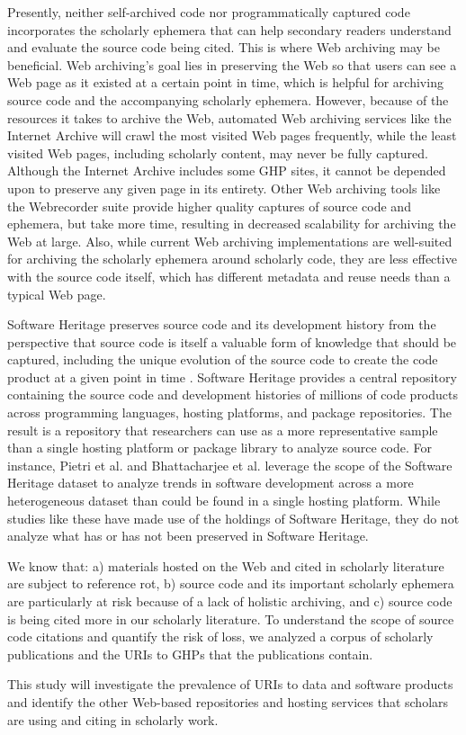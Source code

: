 Presently, neither self-archived code nor programmatically captured code incorporates the scholarly ephemera that can help secondary readers understand and evaluate the source code being cited. This is where Web archiving may be beneficial. Web archiving's goal lies in preserving the Web so that users can see a Web page as it existed at a certain point in time, which is helpful for archiving source code and the accompanying scholarly ephemera. However, because of the resources it takes to archive the Web, automated Web archiving services like the Internet Archive will crawl the most visited Web pages frequently, while the least visited Web pages, including scholarly content, may never be fully captured. Although the Internet Archive includes some GHP sites, it cannot be depended upon to preserve any given page in its entirety. Other Web archiving tools like the Webrecorder suite \cite{webrecorder} provide higher quality captures of source code and ephemera, but take more time, resulting in decreased scalability for archiving the Web at large. Also, while current Web archiving implementations are well-suited for archiving the scholarly ephemera around scholarly code, they are less effective with the source code itself, which has different metadata and reuse needs than a typical Web page. 

Software Heritage preserves source code and its development history from the perspective that source code is itself a valuable form of knowledge that should be captured, including the unique evolution of the source code to create the code product at a given point in time \cite{dicosmo-ipres2017}. Software Heritage provides a central repository containing the source code and development histories of millions of code products across programming languages, hosting platforms, and package repositories. The result is a repository that researchers can use as a more representative sample than a single hosting platform or package library to analyze source code. For instance, Pietri et al. \cite{pietri-msr2020} and Bhattacharjee et al. \cite{bhattacharjee-msr2020} leverage the scope of the Software Heritage dataset to analyze trends in software development across a more heterogeneous dataset than could be found in a single hosting platform. While studies like these have made use of the holdings of Software Heritage, they do not analyze what has or has not been preserved in Software Heritage.

We know that: a) materials hosted on the Web and cited in scholarly literature are subject to reference rot, b) source code and its important scholarly ephemera are particularly at risk because of a lack of holistic archiving,
and c) source code is being cited more in our scholarly literature. To understand the scope of source code citations and quantify the risk of loss, we analyzed a corpus of scholarly publications and the URIs to GHPs that the publications contain.

This study will investigate the prevalence of URIs to data and software products and identify the other Web-based repositories and hosting services that scholars are using and citing in scholarly work. 

